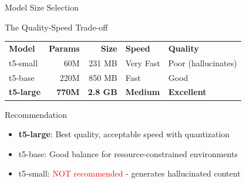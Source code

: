 \begin{frame}{Model Size Selection}
\begin{block}{The Quality-Speed Trade-off}
\begin{center}
\begin{tabular}{l|r|r|l|l}
\textbf{Model} & \textbf{Params} & \textbf{Size} & \textbf{Speed} & \textbf{Quality} \\
t5-small & 60M & 231 MB & Very Fast & Poor (hallucinates) \\
t5-base & 220M & 850 MB & Fast & Good \\
\textbf{t5-large} & \textbf{770M} & \textbf{2.8 GB} & \textbf{Medium} & \textbf{Excellent} \\
\end{tabular}
\end{center}
\end{block}

\begin{block}{Recommendation}
\begin{itemize}
  \item \textbf{t5-large}: Best quality, acceptable speed with quantization
  \item t5-base: Good balance for resource-constrained environments
  \item t5-small: \textcolor{red}{NOT recommended} - generates hallucinated content
\end{itemize}
\end{block}
\end{frame}

